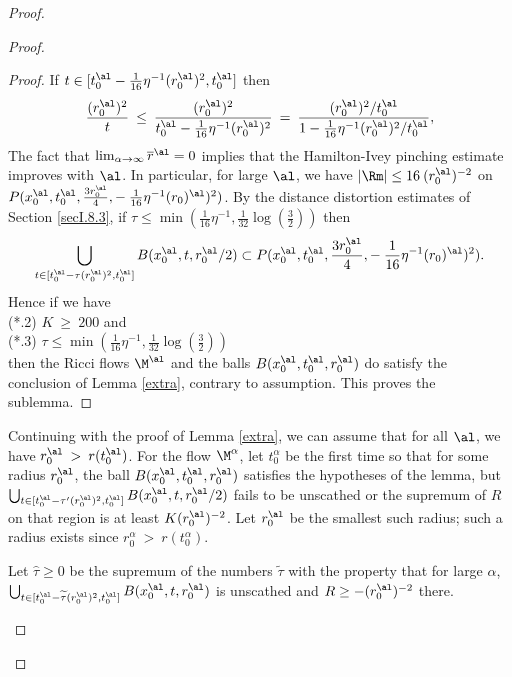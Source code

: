 \begin{proof}
\begin{proof}
\begin{proof}
If $t \in [t_0^\al - \frac{1}{16} \eta^{-1} (r_0^\al)^2, t_0^\al]$ then
\begin{equation}
\frac{(r_0^\al)^2}{t} \: \le \:
\frac{(r_0^\al)^2}{t_0^\al - \frac{1}{16} \eta^{-1} (r_0^\al)^2} \: = \:
\frac{(r_0^\al)^2/t_0^\al}{1 - \frac{1}{16} \eta^{-1} (r_0^\al)^2/t_0^\al},
\end{equation}
The fact that $\lim_{\alpha \rightarrow \infty} \overline{r}^\al = 0$
implies that the Hamilton-Ivey pinching estimate improves with $\al$.
In particular, for large $\al$, we have $|\Rm| \le
16 \: (r_0^\al)^{-2}$ on
$P(x^\al_0, t^\al_0,  \frac{3r_0^\al}{4},
- \: \frac{1}{16} \eta^{-1} (r_0)^\al)^2)$.
By the distance distortion estimates of Section \ref{secI.8.3},
if $\tau \le \min \left( \frac{1}{16} \eta^{-1},
\frac{1}{32} \log(\frac32) \right)$ then
\begin{equation}
\bigcup_{t \in [t_0^\al -\tau (r^\al_0)^2, t^\al_0]}
B(x^\al_0, t, r^\al_0/2) \subset P(x^\al_0, t^\al_0,  \frac{3r_0^\al}{4},
- \: \frac{1}{16} \eta^{-1} (r_0)^\al)^2).
\end{equation}
Hence if we have \\
(*.2) $K \: \ge \: 200$ and \\
(*.3) $\tau \le \min \left( \frac{1}{16} \eta^{-1},
\frac{1}{32} \log(\frac32) \right)$\\
then the Ricci flows $\M^\al$ and the balls
$B(x_0^\al, t_0^\al, r_0^\al)$ do satisfy the conclusion of
Lemma \ref{extra}, contrary to assumption. This proves the
sublemma.
\end{proof}

Continuing with the proof of Lemma \ref{extra}, we can assume that
for all $\al$, we have $r_0^\al \: > \: r(t_0^\al)$.
For the flow $\M^\alpha$,
let $t_0^\alpha$ be the first time so that for some radius $r_0^\al$,
the ball $B(x_0^\al, t_0^\al, r_0^\al)$ satisfies the hypotheses of the
lemma, but
$\bigcup_{t \in [t_0^\al -\tau^\prime (r^\al_0)^2, t^\al_0]}
B(x^\al_0, t, r^\al_0/2)$ fails to be unscathed or the
supremum of $R$ on that region is at least
$K (r_0^\al)^{-2}$.
Let $r_0^\al$ be the smallest such radius;
such a radius exists since
$r_0^\alpha \: > \: r(t_0^\alpha)$.

Let
$\widehat{\tau}\geq 0$
be the supremum of the numbers $\widetilde{\tau}$
with the property that for large $\alpha$,
$\bigcup_{t \in [t_0^\al -\widetilde{\tau} (r^\al_0)^2, t^\al_0]}
B(x^\al_0, t, r^\al_0)$ is unscathed and
$R \ge - (r_0^\al)^{-2}$ there.

\begin{lemma}
  \label{lem:kl-earlier-scalar-curvature-bounds-smaller-balls-from-lower-curvature-bound-estimates-scalar-curvature-8}


\end{lemma}
\end{proof}
\end{proof}

